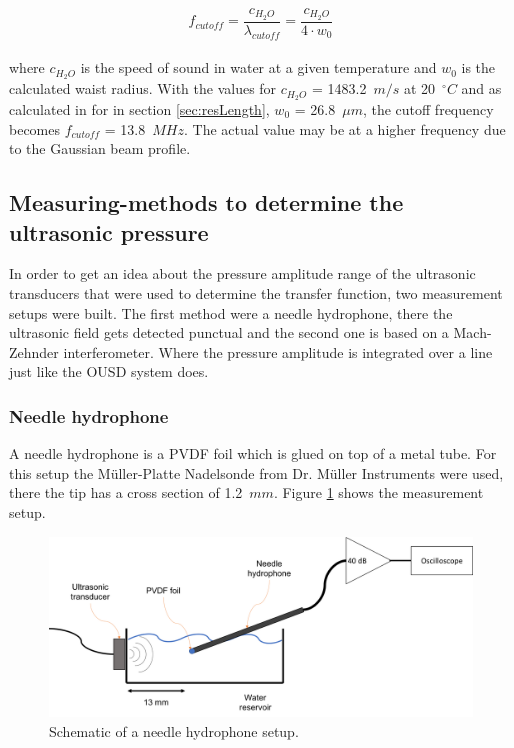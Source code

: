 \begin{equation}
f_{cutoff} = \frac{c_{H_2O}}{\lambda_{cutoff}} =\frac{c_{H_2O}}{4 \cdot w_0}
\label{eq:fCutoff}
\end{equation}
\\
where $c_{H_2O}$ is the speed of sound in water at a given temperature and $w_0$ is the calculated waist radius. With the values for $c_{H_2O}$ = 1483.2~$m/s$ at 20~$^\circ C$ \cite{Haynes:physicalProperties} and as calculated in for in section \ref{sec:resLength}, $w_0$ = 26.8~$\mu m$, the cutoff frequency becomes $f_{cutoff}$ = 13.8~$MHz$. The actual value may be at a higher frequency due to the Gaussian beam profile. 

\subsection{Measuring-methods to determine the ultrasonic pressure}
\label{sec:pMeasureMeth}
In order to get an idea about the pressure amplitude range of the ultrasonic transducers that were used to determine the transfer function, two measurement setups were built. The first method were a needle hydrophone, there the ultrasonic field gets detected punctual and the second one is based on a Mach-Zehnder interferometer. Where the pressure amplitude is integrated over a line just like the OUSD system does. 
 
\subsubsection{Needle hydrophone}

A needle hydrophone is a PVDF foil which is glued on top of a metal tube. For this setup the Müller-Platte Nadelsonde from Dr. Müller Instruments were used, there the tip has a cross section of 1.2~$mm$. Figure \ref{fig:needleHydrophone} shows the measurement setup. 

\begin{figure}[H]
	\centering
	\includegraphics[width = \textwidth, height=0.3\textheight]{05_OUSD/images/NeedleHydro.png}
	\caption{Schematic of a needle hydrophone setup.}
	\label{fig:needleHydrophone}
\end{figure} 


